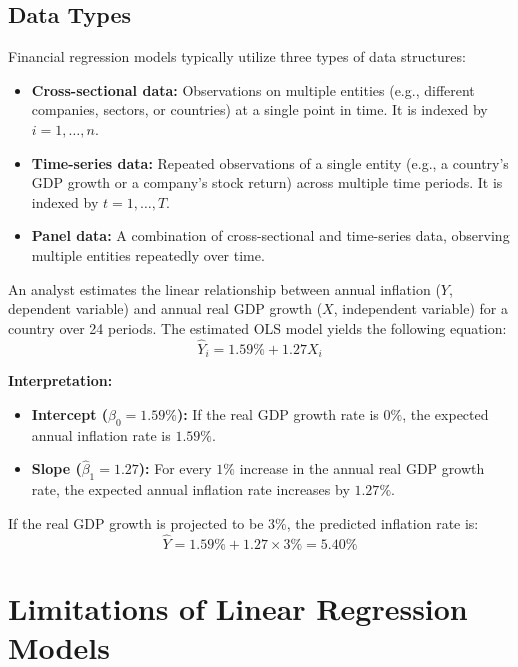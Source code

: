 \subsection{Data Types}
Financial regression models typically utilize three types of data structures:
\begin{itemize}
	\item \textbf{Cross-sectional data:} Observations on multiple entities (e.g., different companies, sectors, or countries) at a single point in time. It is indexed by $i = 1, \dots, n$.
	\item \textbf{Time-series data:} Repeated observations of a single entity (e.g., a country's GDP growth or a company's stock return) across multiple time periods. It is indexed by $t = 1, \dots, T$.
	\item \textbf{Panel data:} A combination of cross-sectional and time-series data, observing multiple entities repeatedly over time.
\end{itemize}

\begin{tcolorbox}[
	colback=gray!5!white,
	colframe=black!15!white,
	boxrule=0.5pt,
	arc=3pt,
	title=\textbf{Example: Estimating Inflation using Real GDP Growth},
	coltitle=black,
	colbacktitle=black!5!white,
	before skip=6pt,
	after skip=6pt,
	breakable
]
An analyst estimates the linear relationship between annual inflation ($Y$, dependent variable) and annual real GDP growth ($X$, independent variable) for a country over 24 periods. The estimated OLS model yields the following equation:
\[ \hat{Y}_i = 1.59\% + 1.27 X_i \]

\textbf{Interpretation:}
\begin{itemize}
	\item \textbf{Intercept ($\hat{\beta}_0 = 1.59\%$):} If the real GDP growth rate is $0\%$, the expected annual inflation rate is $1.59\%$.
	\item \textbf{Slope ($\hat{\beta}_1 = 1.27$):} For every $1\%$ increase in the annual real GDP growth rate, the expected annual inflation rate increases by $1.27\%$.
\end{itemize}
If the real GDP growth is projected to be $3\%$, the predicted inflation rate is:
\[ \hat{Y} = 1.59\% + 1.27 \times 3\% = 5.40\% \]
\end{tcolorbox}

\section{Limitations of Linear Regression Models}
\label{sec:Limitations of Linear Regression Models}

